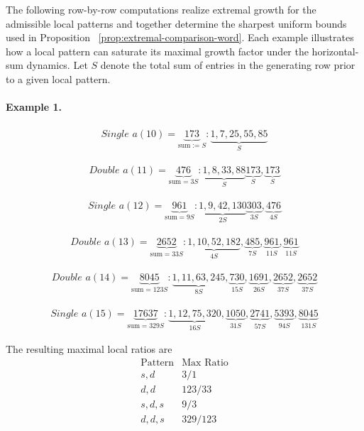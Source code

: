 \documentclass[12pt, oneside]{article}
\numberwithin{equation}{section}
\theoremstyle{definition}
\theoremstyle{plain}
\theoremstyle{remark}
\begin{document}
The following row-by-row computations realize extremal growth for the admissible
local patterns and together determine the sharpest uniform bounds used in
Proposition ~\ref{prop:extremal-comparison-word}.  Each example illustrates how a local pattern
can saturate its maximal growth factor under the horizontal-sum dynamics.  Let $S$
denote the total sum of entries in the generating row prior to a given local pattern.

\paragraph{Example 1.}
\[
\begin{array}{l}
\textit{Single } a(10) = \underbrace{173}_{\text{sum} := S}:
\underbrace{1,7,25,55,85}_{S}
\end{array}
\]

\[
\begin{array}{l}
\textit{Double } a(11) = \underbrace{476}_{\text{sum} = 3S}:
\underbrace{1,8,33,88}_{S}
\underbrace{173}_{S},
\underbrace{173}_{S}
\end{array}
\]

\[
\begin{array}{l}
\textit{Single } a(12) = \underbrace{961}_{\text{sum} = 9S}:
\underbrace{1,9,42,130}_{2S}
\underbrace{303}_{3S},
\underbrace{476}_{4S}
\end{array}
\]

\[
\begin{array}{l}
\textit{Double } a(13) = \underbrace{2652}_{\text{sum} = 33S}:
\underbrace{1,10,52,182}_{4S},
\underbrace{485}_{7S},
\underbrace{961}_{11S},
\underbrace{961}_{11S}
\end{array}
\]

\[
\begin{array}{l}
\textit{Double } a(14) = \underbrace{8045}_{\text{sum} = 123S}:
\underbrace{1,11,63,245}_{8S},
\underbrace{730}_{15S},
\underbrace{1691}_{26S},
\underbrace{2652}_{37S},
\underbrace{2652}_{37S}
\end{array}
\]

\[
\begin{array}{l}
\textit{Single } a(15) = \underbrace{17637}_{\text{sum} = 329S}:
\underbrace{1,12,75,320}_{16S},
\underbrace{1050}_{31S},
\underbrace{2741}_{57S},
\underbrace{5393}_{94S},
\underbrace{8045}_{131S}
\end{array}
\]

The resulting maximal local ratios are
\[
\begin{array}{c|c}
\text{Pattern} & \text{Max Ratio} \\
\hline
s,d & 3/1 \\
d,d & 123/33 \\
s,d,s & 9/3 \\
d,d,s & 329/123
\end{array}
\]
\end{document}
